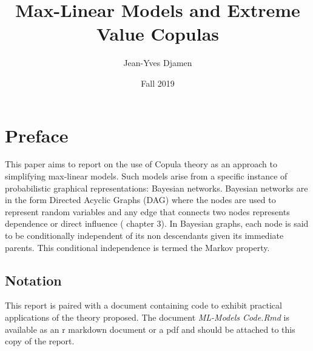 \documentclass[12pt]{article}
\title{Max-Linear Models and Extreme Value Copulas}
\author{Jean-Yves Djamen }
\date{Fall 2019}
\theoremstyle{definition}
\theoremstyle{definition}
\begin{document}
\maketitle
\tableofcontents{}
\pagebreak

\section{Preface}
This paper aims to report on the use of Copula theory as an approach to simplifying max-linear models. Such models arise from a specific instance of probabilistic graphical representations: Bayesian networks. Bayesian networks are in the form Directed Acyclic Graphs (DAG) where the nodes are used to represent random variables and any edge that connects two nodes represents dependence or direct influence (\cite{bayes} chapter 3). In Bayesian graphs, each node is said to be conditionally independent of its non descendants given its immediate parents. This conditional independence is termed the Markov property.

\subsection{Notation}
This report is paired with a document containing code to exhibit practical applications of the theory proposed. The document \textit{ML-Models Code.Rmd} is available as an r markdown document or a pdf and should be attached to this copy of the report.
\end{document}
